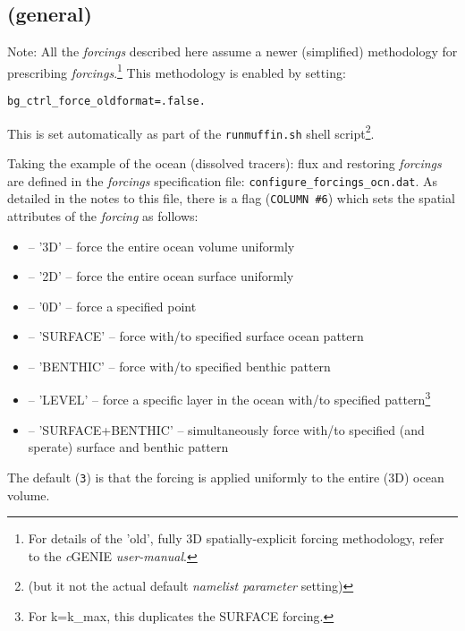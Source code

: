 \documentclass[11pt,fleqn]{book} %
\begin{document}
\subsection*{(general)}
\vspace{1mm}

Note: All the \textit{forcings} described here assume a newer (simplified) methodology for prescribing \textit{forcings}.\footnote{For details of the 'old', fully 3D spatially-explicit forcing methodology, refer to the \textit{c}GENIE \textit{user-manual}.
} This methodology is enabled by setting:
\vspace{-2pt}\small\begin{verbatim}
bg_ctrl_force_oldformat=.false.
\end{verbatim}\vspace{-2pt}\normalsize
This is set automatically as part of the \texttt{runmuffin.sh} shell script\footnote{(but it not the actual default \textit{namelist parameter} setting)}.

Taking the example of the ocean (dissolved tracers): flux and restoring \textit{forcings} are defined in the \textit{forcings} specification file: \texttt{configure\_forcings\_ocn.dat}. As detailed in the notes to this file, there is a flag (\texttt{COLUMN \#6}) which sets the spatial attributes of the \textit{forcing} as follows: 
\vspace{1mm}
\begin{itemize}[noitemsep]
\item [3] -- '3D' -- force the entire ocean volume uniformly
\item [2] -- '2D' -- force the entire ocean surface uniformly
\item [0] -- '0D' -- force a specified point
\item [-1] -- 'SURFACE' -- force with/to specified surface ocean pattern
\item [-2] -- 'BENTHIC' -- force with/to specified benthic pattern
\item [-3] -- 'LEVEL' -- force a specific layer in the ocean with/to specified pattern\footnote{For k=k\_max, this duplicates the SURFACE forcing.}
\item [-4] -- 'SURFACE+BENTHIC' -- simultaneously force with/to specified (and sperate) surface and benthic pattern
\end{itemize}
\vspace{1mm}
The default (\texttt{3}) is that the forcing is applied uniformly to the entire (3D) ocean volume.
\end{document}
